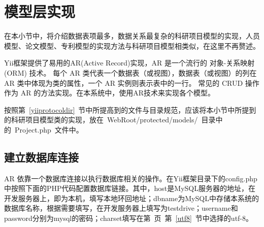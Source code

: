 \section{模型层实现}

在本小节中，将介绍数据表项最多，数据关系最复杂的科研项目模型的实现，人员模型、论文模型、专利模型的实现方法与科研项目模型相类似，在这里不再赘述。

Yii框架提供了易用的AR(Active Record)实现，AR 是一个流行的 对象-关系映射 (ORM) 技术。 每个 AR 类代表一个数据表（或视图），数据表（或视图）的列在 AR 类中体现为类的属性，一个 AR 实例则表示表中的一行。 常见的 CRUD 操作作为 AR 的方法实现。在本系统中，使用AR技术来实现各个模型。

按照第~\ref{yiiprotocoldir}~节中所提高到的文件与目录规范，应该将本小节中所提到的科研项目模型类的实现，放在~WebRoot/protected/models/~目录中的~Project.php~文件中。

\subsection{建立数据库连接}

AR 依靠一个数据库连接以执行数据库相关的操作。在Yii框架目录下的config.php中按照下面的PHP代码配置数据库链接。其中，host是MySQL服务器的地址，在开发服务器上，即为本机，填写本地环回地址；dbname为MySQL中存储本系统的数据库名称，根据需要填写，在开发服务器上填写为testdrive；username和password分别为mysql的密码；charset填写在第~\pageref{utf8}页~第~\ref{utf8}~节中选择的utf-8。


